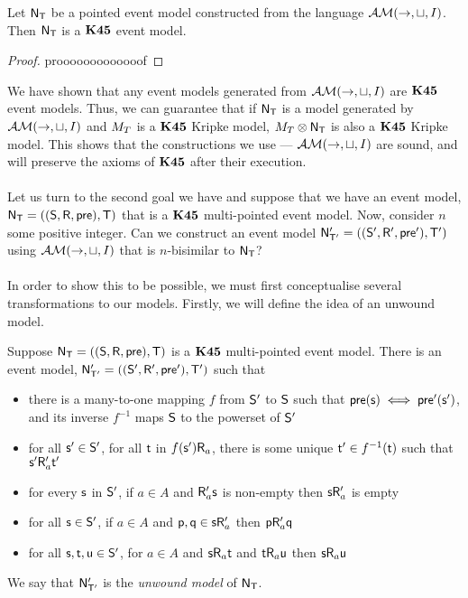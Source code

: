 \begin{lemma}
	Let $\evM_\evT$ be a pointed event model constructed from the language $\EM(\to,\sqcup,I)$.
	Then $\evM_\evT$ is a $\AXKFF$ event model.
\end{lemma}
\begin{proof}
	\FIXME prooooooooooooof
\end{proof}

We have shown that any event models generated from $\EM(\to,\sqcup, I)$ are
$\AXKFF$ event models.
Thus, we can guarantee that if $\evM_\evT$ is a model generated by
$\EM(\to,\sqcup,I)$ and $\krMo_T$ is a $\AXKFF$ Kripke model, $\krMo_T
\otimes \evM_\evT$ is also a $\AXKFF$ Kripke model.
This shows that the constructions we use --- $\EM(\to, \sqcup, I)$ are
sound, and will preserve the axioms of $\AXKFF$ after their execution.\\
\\
Let us turn to the second goal we have and suppose that we have an event model, $\evM_\evT
= ((\evS,\evR,\evpr),\evT)$ that is a $\AXKFF$ multi-pointed event model.
Now, consider $n$ some positive integer.
Can we construct an event model $\evM'_{\evT'} = ((\evS',\evR',\evpr'),\evT')$
using $\EM(\to,\sqcup,I)$ that is $n$-bisimilar to $\evM_\evT$?\\
\\
In order to show this to be possible, we must first conceptualise several
transformations to our models.
Firstly, we will define the idea of an unwound model.

\begin{defn}\label{def:unwoundModel}
  Suppose $\evM_\evT = ((\evS,\evR,\evpr),\evT)$ is a $\AXKFF$ multi-pointed
  event model.
  There is an event model, $\evM'_{\evT'} = ((\evS',\evR',\evpr'),\evT')$ such that
  \begin{itemize}
		\item there is a many-to-one mapping $f$ from $\evS'$ to $\evS$ such that $\evpr(\evs) \iff
			\evpr'(\evs')$, and its inverse $f^{-1}$ maps
			$\evS$ to the powerset of $\evS'$
		\item for all $\evs' \in \evS'$, for all $\evt$ in $f(\evs') \evR_a$, there is some unique $\evt' \in
			f^{-1}(\evt)$ such that $\evs' \evR'_a \evt'$
    \item for every $\evs$ in $\evS'$, if $a \in A$ and $\evR'_a \evs$ is non-empty then
    $\evs \evR'_a$ is empty
    \item for all $\evs \in \evS'$, if $a \in A$ and $\evp, \evq \in \evs \evR'_a$ then $\evp
    \evR'_a \evq$
		\item for all $\evs, \evt, \evu \in \evS'$, for $a \in A$ and $\evs \evR_a \evt$ and $\evt
			\evR_a \evu$ then $\evs \evR_a \evu$
  \end{itemize}
  We say that $\evM'_{\evT'}$ is the {\em unwound model} of $\evM_\evT$.
\end{defn}

